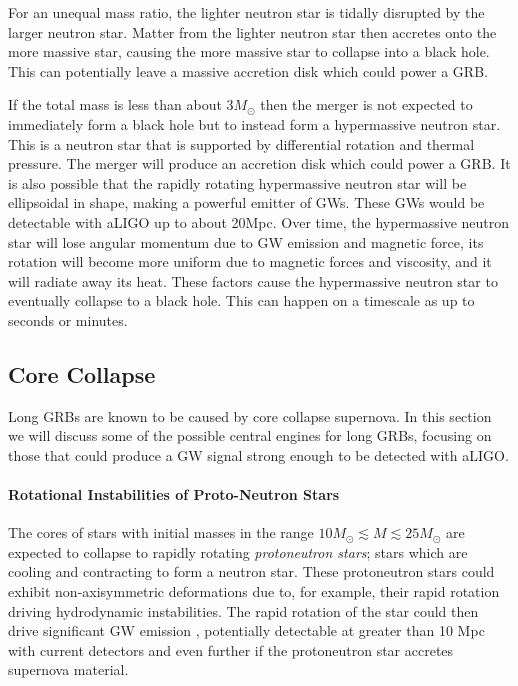 \documentclass[11pt]{cuthesis}
\begin{document}
For an unequal mass ratio, the lighter neutron star is tidally disrupted by the larger neutron star. Matter from the lighter neutron star then accretes onto the more massive star, causing the more massive star to collapse into a black hole. This can potentially leave a massive accretion disk which could power a GRB.  

If the total mass is less than about 3$M_\odot$\cite{gw_grb_paradigm} then the merger is not expected to immediately form a black hole but to instead form a hypermassive neutron star. This is a neutron star that is supported by differential rotation and thermal pressure. The merger will produce an accretion disk which could power a GRB. It is also possible that the rapidly rotating hypermassive neutron star will be ellipsoidal in shape, making a powerful emitter of GWs. These GWs would be detectable with aLIGO up to about 20Mpc\cite{gw_grb_paradigm}. Over time, the hypermassive neutron star will lose angular momentum due to GW emission and magnetic force, its rotation will become more uniform due to magnetic forces and viscosity, and it will radiate away its heat. These factors cause the hypermassive neutron star to eventually collapse to a black hole. This can happen on a timescale as up to seconds or minutes\cite{Baiotti_2017,Faber2012}. 

\subsection{Core Collapse}
Long GRBs are known to be caused by core collapse supernova. In this section we will discuss some of the possible central engines for long GRBs, focusing on those that could produce a GW signal strong enough to be detected with aLIGO. 

\paragraph{Rotational Instabilities of Proto-Neutron Stars} 
The cores of stars with initial masses in the range $10M_\odot \lesssim M \lesssim 25M_\odot$ are expected to collapse to rapidly rotating \textit{protoneutron stars}; stars which are cooling and contracting to form a neutron star. \cite{gw_grb_paradigm} These protoneutron stars could exhibit non-axisymmetric deformations due to, for example, their rapid rotation driving hydrodynamic instabilities.  The rapid rotation of the star could then drive significant GW emission \cite{Stergioulas2003}, potentially detectable at greater than 10 Mpc with current detectors and even further if the protoneutron star accretes supernova material. \cite{gw_grb_paradigm} 
\end{document}
